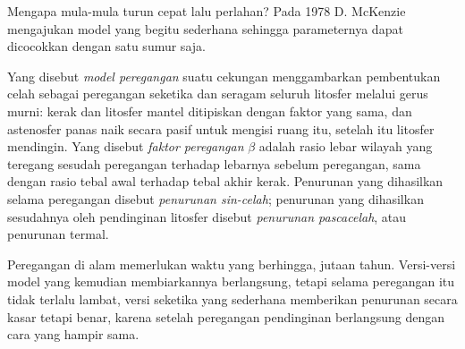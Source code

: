 Mengapa  mula-mula turun cepat lalu perlahan? Pada 1978 D. McKenzie mengajukan model yang begitu
sederhana sehingga parameternya dapat dicocokkan dengan satu sumur saja.

\begin{definition}\label{def:b2:basins-compared:stretching}
Yang disebut \emph{model peregangan} suatu cekungan menggambarkan pembentukan celah sebagai
peregangan seketika dan seragam seluruh litosfer melalui gerus murni: kerak dan litosfer mantel
ditipiskan dengan faktor yang sama, dan astenosfer panas naik secara pasif untuk mengisi
ruang itu, setelah itu litosfer mendingin. Yang disebut \emph{faktor peregangan}
$\beta$ adalah rasio lebar wilayah yang teregang sesudah peregangan terhadap lebarnya sebelum peregangan,
sama dengan rasio tebal awal terhadap tebal akhir kerak. Penurunan yang dihasilkan
selama peregangan disebut \emph{penurunan sin-celah}; penurunan yang dihasilkan
sesudahnya oleh pendinginan litosfer disebut \emph{penurunan pascacelah},
atau penurunan termal.
\end{definition}

Peregangan di alam memerlukan waktu yang berhingga, jutaan tahun. Versi-versi model yang kemudian membiarkannya
berlangsung, tetapi selama peregangan itu tidak terlalu lambat, versi seketika yang sederhana memberikan penurunan
secara kasar tetapi benar, karena setelah peregangan pendinginan berlangsung dengan cara yang hampir sama.

